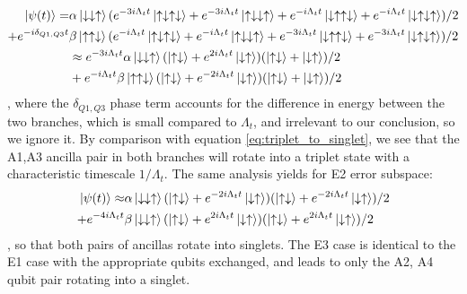 \documentclass{report}
\begin{document}
\begin{align*}
    \ket{\psi(t)} = &\alpha\ket{\downarrow\downarrow\uparrow}(
        e^{-3 i \Lambda_t t }\ket{\uparrow\downarrow\uparrow\downarrow} 
    + e^{-3 i \Lambda_t t }\ket{\uparrow\downarrow\downarrow\uparrow}
    + e^{-i \Lambda_t t }\ket{\downarrow\uparrow\uparrow\downarrow}
    + e^{-i \Lambda_t t }\ket{\downarrow\uparrow\downarrow\uparrow})/2 \\
    + e^{-i\delta_{Q1,Q3} t} &\beta\ket{\uparrow\uparrow\downarrow}(
        e^{- i \Lambda_t t }\ket{\uparrow\downarrow\uparrow\downarrow} 
    + e^{- i \Lambda_t t }\ket{\uparrow\downarrow\downarrow\uparrow}
    + e^{-3i \Lambda_t t }\ket{\downarrow\uparrow\uparrow\downarrow}
    + e^{-3i \Lambda_t t }\ket{\downarrow\uparrow\downarrow\uparrow})/2 \\
    &\approx e^{-3 i \Lambda_t t}\alpha\ket{\downarrow\downarrow\uparrow}
    (\ket{\uparrow\downarrow} + e^{2 i \Lambda_t t }\ket{\downarrow\uparrow})
    (\ket{\uparrow\downarrow} + \ket{\downarrow\uparrow})/2 \\
    &+ e^{- i \Lambda_t t}\beta\ket{\uparrow\uparrow\downarrow}
    (\ket{\uparrow\downarrow} + e^{-2 i \Lambda_t t }\ket{\downarrow\uparrow})
    (\ket{\uparrow\downarrow} + \ket{\downarrow\uparrow})/2
\end{align*}, where the $\delta_{Q1, Q3}$ phase term accounts for the difference in energy between the two branches, which is small compared to $\Lambda_t$, and irrelevant to our conclusion, so we ignore it. By comparison with equation \ref{eq:triplet_to_singlet}, we see that the A1,A3 ancilla pair in both branches will rotate into a triplet state with a characteristic timescale $1/\Lambda_t$. The same analysis yields for E2 error subspace:
\begin{align*}
    \ket{\psi(t)} \approx &\alpha\ket{\downarrow\downarrow\uparrow}
    (\ket{\uparrow\downarrow} + e^{ -2 i \Lambda_t t }\ket{\downarrow\uparrow})
    (\ket{\uparrow\downarrow} + e^{ -2 i \Lambda_t t }\ket{\downarrow\uparrow})/2 \\
    + e^{-4 i \Lambda_t t} &\beta\ket{\downarrow\downarrow\uparrow}
    (\ket{\uparrow\downarrow} + e^{ 2 i \Lambda_t t }\ket{\downarrow\uparrow})
    (\ket{\uparrow\downarrow} + e^{ 2 i \Lambda_t t }\ket{\downarrow\uparrow})/2
\end{align*}, so that both pairs of ancillas rotate into singlets. The E3 case is identical to the E1 case with the appropriate qubits exchanged, and leads to only the A2, A4 qubit pair rotating into a singlet.
\end{document}
